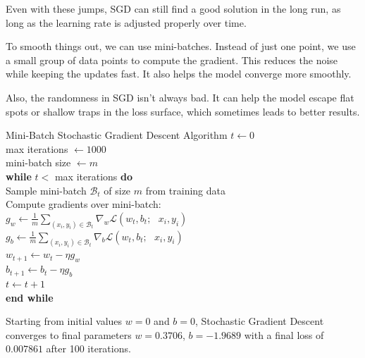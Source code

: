 Even with these jumps, SGD can still find a good solution in the long run, as long as the learning rate is adjusted properly over time.

To smooth things out, we can use mini-batches. Instead of just one point, we use a small group of data points to compute the gradient. This reduces the noise while keeping the updates fast. It also helps the model converge more smoothly.

Also, the randomness in SGD isn’t always bad. It can help the model escape flat spots or shallow traps in the loss surface, which sometimes leads to better results.



\begin{algobox}{Mini-Batch Stochastic Gradient Descent Algorithm}
\( t \gets 0 \) \\
max iterations \( \gets 1000 \) \\
mini-batch size \( \gets m \) \\

\textbf{while} \( t < \) max iterations \textbf{do} \\
\hspace*{1em} Sample mini-batch \( \mathcal{B}_t \) of size \( m \) from training data \\

\hspace*{1em} Compute gradients over mini-batch: \\
\hspace*{2em} \( g_w \gets \frac{1}{m} \sum_{(x_i,y_i) \in \mathcal{B}_t} \nabla_w \mathcal{L}(w_t, b_t; \text{ }x_i, y_i) \) \\
\hspace*{2em} \( g_b \gets \frac{1}{m} \sum_{(x_i,y_i) \in \mathcal{B}_t} \nabla_b \mathcal{L}(w_t, b_t; \text{ }x_i, y_i) \) \\

\hspace*{2em} \( w_{t+1} \gets w_t - \eta g_w \) \\
\hspace*{2em} \( b_{t+1} \gets b_t - \eta g_b \) \\

\hspace*{1em} \( t \gets t + 1 \) \\
\textbf{end while}
\end{algobox}

Starting from initial values \( w = 0 \) and \( b = 0 \), Stochastic Gradient Descent converges to final parameters \( w = 0.3706 \), \( b = -1.9689 \) with a final loss of \( 0.007861 \) after 100 iterations.

